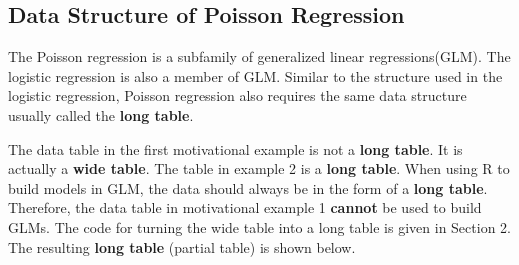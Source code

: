 \documentclass[
]{book}
\begin{document}
\hypertarget{data-structure-of-poisson-regression}{%
\subsection{Data Structure of Poisson Regression}\label{data-structure-of-poisson-regression}}

The Poisson regression is a subfamily of generalized linear regressions(GLM). The logistic regression is also a member of GLM. Similar to the structure used in the logistic regression, Poisson regression also requires the same data structure usually called the \textbf{long table}.

The data table in the first motivational example is not a \textbf{long table}. It is actually a \textbf{wide table}. The table in example 2 is a \textbf{long table}. When using R to build models in GLM, the data should always be in the form of a \textbf{long table}. Therefore, the data table in motivational example 1 \textbf{cannot} be used to build GLMs. The code for turning the wide table into a long table is given in Section 2. The resulting \textbf{long table} (partial table) is shown below.
\end{document}
